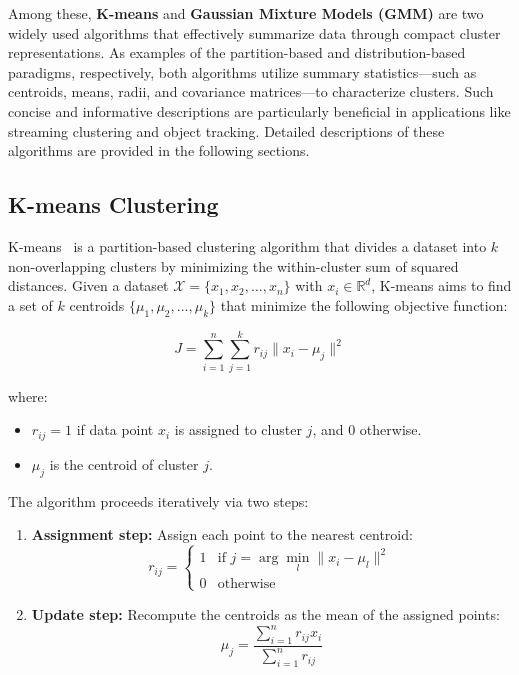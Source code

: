 Among these, \textbf{K-means} and \textbf{Gaussian Mixture Models (GMM)} are
two widely used algorithms that effectively summarize data through compact
cluster representations. As examples of the partition-based and
distribution-based paradigms, respectively, both algorithms utilize summary
statistics—such as centroids, means, radii, and covariance matrices—to
characterize clusters. Such concise and informative descriptions are
particularly beneficial in applications like streaming clustering and object
tracking. Detailed descriptions of these algorithms are provided in the
following sections.

\subsection*{K-means Clustering}
K-means~\cite{k_means} is a partition-based clustering algorithm that divides a
dataset into $k$ non-overlapping clusters by minimizing the within-cluster sum
of squared distances. Given a dataset $\mathcal{X} = \{x_1, x_2, \ldots, x_n\}$
with $x_i \in \mathbb{R}^d$, K-means aims to find a set of $k$ centroids
$\{\mu_1, \mu_2, \ldots, \mu_k\}$ that minimize the following objective
function:

\begin{equation}
    J = \sum_{i=1}^{n} \sum_{j=1}^{k} r_{ij} \| x_i - \mu_j \|^2
\end{equation}

where:
\begin{itemize}
    \item $r_{ij} = 1$ if data point $x_i$ is assigned to cluster $j$, and $0$ otherwise.
    \item $\mu_j$ is the centroid of cluster $j$.
\end{itemize}

The algorithm proceeds iteratively via two steps:
\begin{enumerate}
    \item \textbf{Assignment step:} Assign each point to the nearest centroid:
          \begin{equation}
              r_{ij} =
              \begin{cases}
                  1 & \text{if } j = \arg \min_{l} \|x_i - \mu_l\|^2 \\
                  0 & \text{otherwise}
              \end{cases}
          \end{equation}
    \item \textbf{Update step:} Recompute the centroids as the mean of the assigned points:
          \begin{equation}
              \mu_j = \frac{\sum_{i=1}^{n} r_{ij} x_i}{\sum_{i=1}^{n} r_{ij}}
          \end{equation}
\end{enumerate}

